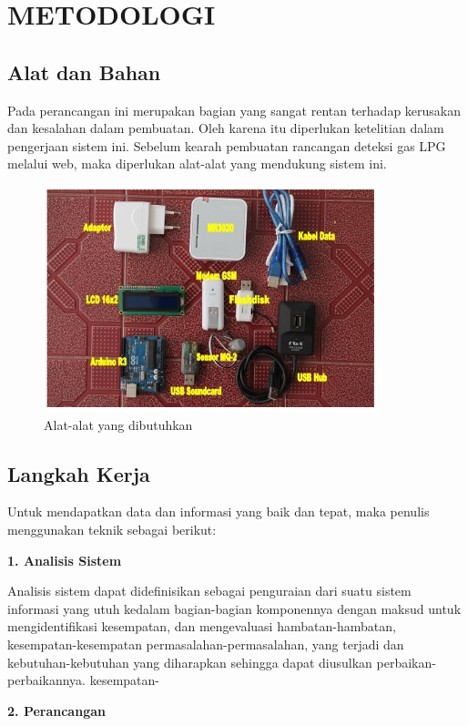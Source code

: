 \documentclass{jtetiproposalskripsi}
\begin{document}
\chapter{METODOLOGI}

\section{Alat dan Bahan}
Pada perancangan ini merupakan bagian yang sangat rentan terhadap kerusakan dan kesalahan dalam pembuatan. Oleh karena itu diperlukan ketelitian dalam pengerjaan sistem ini. Sebelum kearah pembuatan rancangan deteksi gas LPG melalui web, maka diperlukan alat-alat yang mendukung sistem ini.

\begin{figure}[ht!]
  \centering
    \includegraphics{gambar/1}
    \caption{Alat-alat yang dibutuhkan}
    \label{1}
\end{figure}

\section{Langkah Kerja}

Untuk mendapatkan data dan informasi yang baik dan tepat, maka penulis menggunakan teknik sebagai berikut:

\textbf{1. Analisis Sistem}

Analisis sistem dapat didefinisikan sebagai penguraian dari suatu sistem informasi yang utuh kedalam bagian-bagian komponennya dengan maksud untuk mengidentifikasi kesempatan, dan mengevaluasi hambatan-hambatan, kesempatan-kesempatan permasalahan-permasalahan, yang terjadi dan kebutuhan-kebutuhan yang diharapkan sehingga dapat diusulkan perbaikan-perbaikannya. kesempatan-

\textbf{2. Perancangan}
\end{document}
